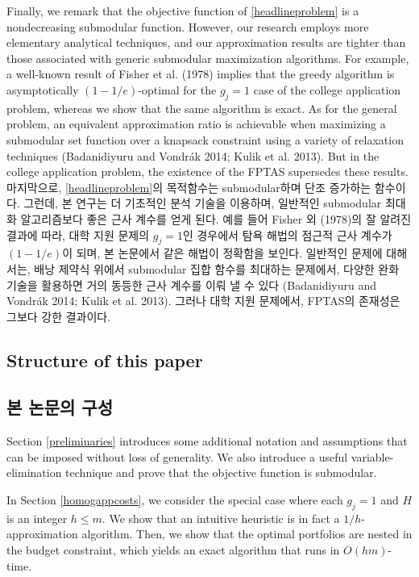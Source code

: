 \documentclass[11pt]{article} %
\theoremstyle{definition}
\theoremstyle{definition}
\begin{document}
\ifen
Finally, we remark that the objective function of \eqref{headlineproblem} is a nondecreasing submodular function. However, our research employs more elementary analytical techniques, and our approximation results are tighter than those associated with generic submodular maximization algorithms. For example, a well-known result of Fisher et al. (1978) implies that the greedy algorithm is asymptotically $(1 - 1/e)$-optimal for the $g_j = 1$ case of the college application problem, whereas we show that the same algorithm is exact. As for the general problem, an equivalent approximation ratio is achievable when maximizing a submodular set function over a knapsack constraint using a variety of relaxation techniques (Badanidiyuru and Vondrák 2014; Kulik et al. 2013). But in the college application problem, the existence of the FPTAS supersedes these results.
\else
마지막으로, \eqref{headlineproblem}의 목적함수는 submodular하며 단조 증가하는 함수이다. 그런데, 본 연구는 더 기초적인 분석 기술을 이용하며, 일반적인 submodular 최대화 알고리즘보다 좋은 근사 계수를 얻게 된다. 예를 들어 Fisher 외 (1978)의 잘 알려진 결과에 따라, 대학 지원 문제의 $g_j = 1$인 경우에서 탐욕 해법의 점근적 근사 계수가 $(1 - 1/e)$이 되며, 본 논문에서 같은 해법이 정확함을 보인다. 일반적인 문제에 대해서는, 배낭 제약식 위에서 submodular 집합 함수를 최대하는 문제에서, 다양한 완화 기술을 활용하면 거의 동등한 근사 계수를 이뤄 낼 수 있다 (Badanidiyuru and Vondrák 2014; Kulik et al. 2013). 그러나 대학 지원 문제에서, FPTAS의 존재성은 그보다 강한 결과이다.
\fi

\ifen \subsection{Structure of this paper} \else \subsection{본 논문의 구성}\fi
\ifen Section \ref{preliminaries} introduces some additional notation and assumptions that can be imposed without loss of generality. We also introduce a useful variable-elimination technique and prove that the objective function is submodular. 

In Section \ref{homogappcosts}, we consider the special case where each $g_j = 1$ and $H$ is an integer $h \leq m$.  We show that an intuitive heuristic is in fact a $1/h$-approximation algorithm. Then, we show that the optimal portfolios are nested in the budget constraint, which yields an exact algorithm that runs in $O(hm)$-time. 
\end{document}
